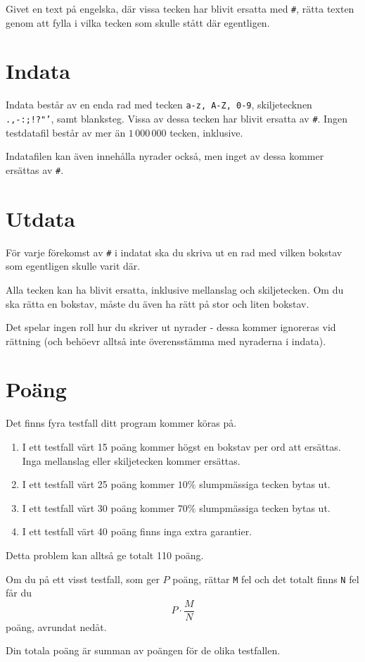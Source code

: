 
Givet en text på engelska, där vissa tecken har blivit ersatta med \texttt{\#}, rätta texten genom att fylla i vilka tecken som skulle stått där egentligen.

\section*{Indata}
Indata består av en enda rad med tecken \texttt{a-z, A-Z, 0-9}, skiljetecknen \texttt{.,-:;!?"'}, samt blanksteg. Vissa av dessa tecken har blivit ersatta av \texttt{\#}.
Ingen testdatafil består av mer än $1\,000\,000$ tecken, inklusive.

Indatafilen kan även innehålla nyrader också, men inget av dessa kommer ersättas av \texttt{\#}.

\section*{Utdata}
För varje förekomst av \texttt{\#} i indatat ska du skriva ut en rad med vilken bokstav som egentligen skulle varit där.

Alla tecken kan ha blivit ersatta, inklusive mellanslag och skiljetecken. Om du ska rätta en bokstav, måste du även ha rätt på stor och liten bokstav.

Det spelar ingen roll hur du skriver ut nyrader - dessa kommer ignoreras vid rättning (och behöevr alltså inte överensstämma med nyraderna i indata).

\section*{Poäng}

Det finns fyra testfall ditt program kommer köras på.
\begin{enumerate}
  \item I ett testfall värt 15 poäng kommer högst en bokstav per ord att ersättas. Inga mellanslag eller skiljetecken kommer ersättas.
  \item I ett testfall värt 25 poäng kommer $10\%$ slumpmässiga tecken bytas ut.
  \item I ett testfall värt 30 poäng kommer $70\%$ slumpmässiga tecken bytas ut.
  \item I ett testfall värt 40 poäng finns inga extra garantier.
\end{enumerate}

Detta problem kan alltså ge totalt 110 poäng.

Om du på ett visst testfall, som ger $P$ poäng, rättar \texttt{M} fel och det totalt finns \texttt{N} fel får du 
$$P \cdot \frac{M}{N}$$
poäng, avrundat nedåt.

Din totala poäng är summan av poängen för de olika testfallen.
